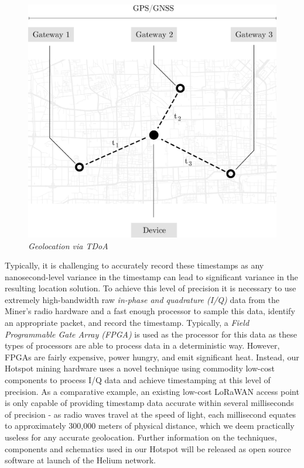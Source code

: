 \documentclass[10pt, nonatbib, nocopyrightspace, reprint]{sigplanconf}
\begin{document}
\begin{figure}[H]
    \begin{center}
          \includegraphics[width=\columnwidth]{tdoa.eps}
          \caption{\emph{Geolocation via TDoA}}\label{fig:tdoa}
     \end{center}
\end{figure}

Typically, it is challenging to accurately record these timestamps as any nanosecond-level variance in the timestamp can lead to significant variance in the resulting location solution. To achieve this level of precision it is necessary to use extremely high-bandwidth raw \emph{in-phase and quadrature (I/Q)} data from the Miner's radio hardware and a fast enough processor to sample this data, identify an appropriate packet, and record the timestamp. Typically, a \emph{Field Programmable Gate Array (FPGA)} is used as the processor for this data as these types of processors are able to process data in a deterministic way. However, FPGAs are fairly expensive, power hungry, and emit significant heat. Instead, our Hotspot mining hardware uses a novel technique using commodity low-cost components to process I/Q data and achieve timestamping at this level of precision. As a comparative example, an existing low-cost LoRaWAN \cite{lorawan} access point is only capable of providing timestamp data accurate within several milliseconds of precision - as radio waves travel at the speed of light, each millisecond equates to approximately 300,000 meters of physical distance, which we deem practically useless for any accurate geolocation. Further information on the techniques, components and schematics used in our Hotspot will be released as open source software at launch of the Helium network.
\end{document}
